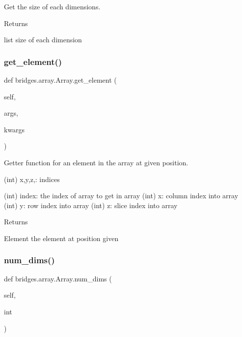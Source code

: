 Get the size of each dimensions. 

\begin{DoxyReturn}{Returns}


list size of each dimension 
\end{DoxyReturn}
\mbox{\label{classbridges_1_1array_1_1_array_ae02a649c2d9a1b830b36650d5a308105}} 
\subsubsection{\texorpdfstring{get\+\_\+element()}{get\_element()}}
{\footnotesize\ttfamily def bridges.\+array.\+Array.\+get\+\_\+element (\begin{DoxyParamCaption}\item[{}]{self,  }\item[{}]{args,  }\item[{}]{kwargs }\end{DoxyParamCaption})}



Getter function for an element in the array at given position. 

(int) x,y,z,\+: indices

(int) index\+: the index of array to get in array (int) x\+: column index into array (int) y\+: row index into array (int) z\+: slice index into array \begin{DoxyReturn}{Returns}


Element the element at position given 
\end{DoxyReturn}
\mbox{\label{classbridges_1_1array_1_1_array_aaef2013f0e3befd61c0497638f409bc8}} 
\subsubsection{\texorpdfstring{num\+\_\+dims()}{num\_dims()}\hspace{0.1cm}{\footnotesize\ttfamily [1/2]}}
{\footnotesize\ttfamily def bridges.\+array.\+Array.\+num\+\_\+dims (\begin{DoxyParamCaption}\item[{}]{self,  }\item[{}]{int }\end{DoxyParamCaption})}




